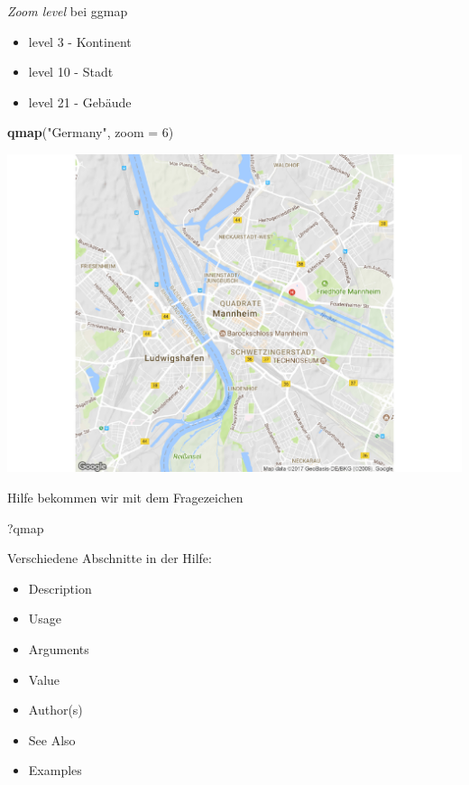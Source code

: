 \documentclass[ignorenonframetext,]{beamer}
\newenvironment{Shaded}{}{}
\newcommand{\KeywordTok}[1]{\textcolor[rgb]{0.00,0.44,0.13}{\textbf{{#1}}}}
\newcommand{\DataTypeTok}[1]{\textcolor[rgb]{0.56,0.13,0.00}{{#1}}}
\newcommand{\DecValTok}[1]{\textcolor[rgb]{0.25,0.63,0.44}{{#1}}}
\newcommand{\StringTok}[1]{\textcolor[rgb]{0.25,0.44,0.63}{{#1}}}
\newcommand{\NormalTok}[1]{{#1}}
\providecommand{\tightlist}{%
\setlength{\itemsep}{0pt}\setlength{\parskip}{0pt}}
\begin{document}
\begin{frame}[fragile]{\emph{Zoom level} bei ggmap}

\begin{itemize}
\tightlist
\item
  level 3 - Kontinent
\item
  level 10 - Stadt
\item
  level 21 - Gebäude
\end{itemize}

\begin{Shaded}
\begin{Highlighting}[]
\KeywordTok{qmap}\NormalTok{(}\StringTok{"Germany"}\NormalTok{, }\DataTypeTok{zoom =} \DecValTok{6}\NormalTok{)}
\end{Highlighting}
\end{Shaded}

\includegraphics{R_intern_files/figure-beamer/unnamed-chunk-260-1.pdf}

\end{frame}

\begin{frame}[fragile]{Hilfe bekommen wir mit dem Fragezeichen}

\begin{Shaded}
\begin{Highlighting}[]
\NormalTok{?qmap}
\end{Highlighting}
\end{Shaded}

Verschiedene Abschnitte in der Hilfe:

\begin{itemize}
\tightlist
\item
  Description
\item
  Usage
\item
  Arguments
\item
  Value
\item
  Author(s)
\item
  See Also
\item
  Examples
\end{itemize}

\end{frame}
\end{document}
